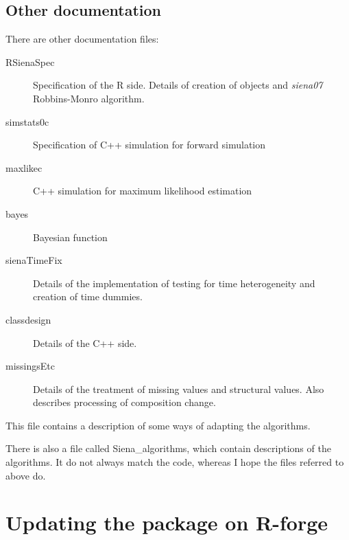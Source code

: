 \documentclass[12pt, a4paper]{article}
\renewcommand{\=}{\,=\,}
\newcommand{\+}{\,+\,}
\newcommand{\nnm}[1]{\textsf{\small\textit{#1}}}
\begin{document}
\subsection{Other documentation}
\label{S_otherDoc}
There are other documentation files:
\begin{description}
\item[RSienaSpec] Specification of the R side.  Details of creation of objects
  and \nnm{siena07} Robbins-Monro algorithm.
\item[simstats0c] Specification of C++ simulation for forward simulation
\item[maxlikec] C++ simulation for maximum likelihood estimation
\item[bayes] Bayesian function
\item[sienaTimeFix] Details of the implementation of testing for time
  heterogeneity and creation of time dummies.
\item[classdesign] Details of the C++ side.
\item[missingsEtc] Details of the treatment of missing values and structural
  values. Also describes processing of composition change.
\end{description}
This file contains a description of some ways of adapting the algorithms.

There is also a file called Siena\_algorithms,
which contain descriptions of the algorithms. It do not always match the
code, whereas I hope the files referred to above do.
\section{Updating the package on R-forge}
\end{document}

